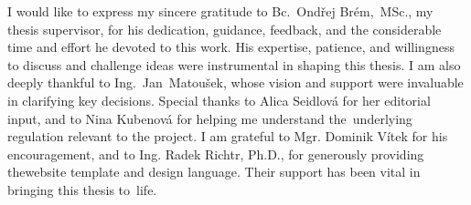 \documentclass[english,bachelor,oneside]{ctufit-thesis} %
\begin{document}
 
\frontmatter\frontmatterinit %

\thispagestyle{empty}\maketitle\thispagestyle{empty}\cleardoublepage %


\imprintpage %
\stopTOCentries

\begin{acknowledgmentpage}
    I would like to express my sincere gratitude to Bc.~Ondřej Brém,~MSc., my thesis supervisor, for his dedication, guidance, feedback, and the considerable time and effort he devoted to this work. His expertise, patience, and willingness to discuss and challenge ideas were instrumental in shaping this thesis.
    I am also deeply thankful to Ing.~Jan~Matoušek, whose vision and support were invaluable in clarifying key decisions.
    Special thanks to Alica Seidlová for her editorial input, and to Nina Kubenová for helping me understand the~underlying regulation relevant to the project.
    I am grateful to Mgr. Dominik Vítek for his encouragement, and to Ing. Radek Richtr, Ph.D., for generously providing thewebsite template and design language.
    Their support has been vital in bringing this thesis to~life.
\end{acknowledgmentpage} 
\end{document}
